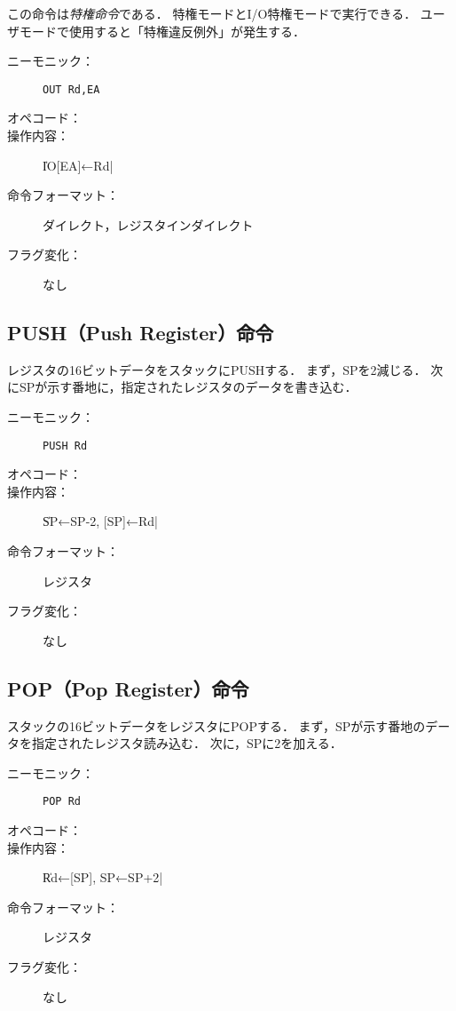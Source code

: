 この命令は\emph{特権命令}である．
特権モードとI/O特権モードで実行できる．
ユーザモードで使用すると「特権違反例外」が発生する．

\begin{description}
\item[ニーモニック：] \texttt{OUT Rd,EA}
\item[オペコード：] 
\item[操作内容：] \|IO[EA]←Rd|
\item[命令フォーマット：] ダイレクト，レジスタインダイレクト
\item[フラグ変化：] なし
\end{description}

\subsection{PUSH（Push Register）命令}
レジスタの16ビットデータをスタックにPUSHする．
まず，SPを2減じる．
次にSPが示す番地に，指定されたレジスタのデータを書き込む．

\begin{description}
\item[ニーモニック：] \texttt{PUSH Rd}
\item[オペコード：] 
\item[操作内容：] \|SP←SP-2, [SP]←Rd|

\item[命令フォーマット：] レジスタ
\item[フラグ変化：] なし
\end{description}

\subsection{POP（Pop Register）命令}
スタックの16ビットデータをレジスタにPOPする．
まず，SPが示す番地のデータを指定されたレジスタ読み込む．
次に，SPに2を加える．

\begin{description}
\item[ニーモニック：] \texttt{POP Rd}
\item[オペコード：] 
\item[操作内容：] \|Rd←[SP], SP←SP+2|
\item[命令フォーマット：] レジスタ
\item[フラグ変化：] なし
\end{description}

